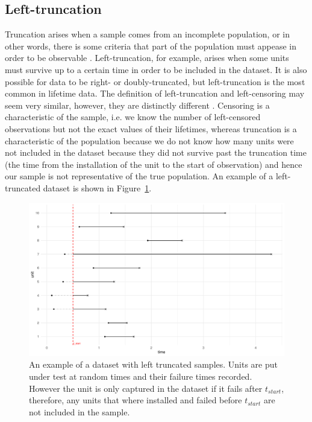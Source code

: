 \subsection{Left-truncation}

Truncation arises when a sample comes from an incomplete population, or in other words, there is some criteria that part of the population must appease in order to be observable \citep{guo1993}. Left-truncation, for example, arises when some units must survive up to a certain time in order to be included in the dataset. It is also possible for data to be right- or doubly-truncated, but left-truncation is the most common in lifetime data. The definition of left-truncation and left-censoring may seem very similar, however, they are distinctly different \citep{mitra2013}. Censoring is a characteristic of the sample, i.e. we know the number of left-censored observations but not the exact values of their lifetimes, whereas truncation is a characteristic of the population because we do not know how many units were not included in the dataset because they did not survive past the truncation time (the time from the installation of the unit to the start of observation) and hence our sample is not representative of the true population. An example of a left-truncated dataset is shown in Figure~\ref{fig:left_trunc_example}. 

\begin{figure}[h]
    \centering
    \includegraphics[width=1\textwidth]{./figures/left_truncation_example.pdf}
    \caption{An example of a dataset with left truncated samples. Units are put under test at random times and their failure times recorded. However the unit is only captured in the dataset if it fails after $t_{start}$, therefore, any units that where installed and failed before $t_{start}$ are not included in the sample.}
    \label{fig:left_trunc_example}
\end{figure}

